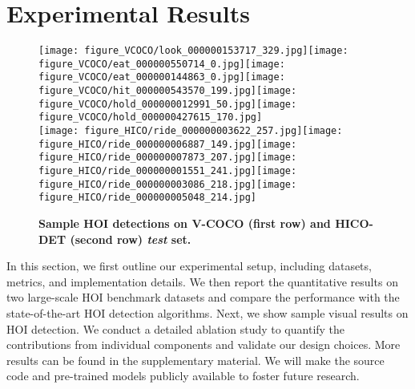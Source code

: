 \section{Experimental Results}
\label{sec:results}
\newlength\ftqa
\setlength\ftqa{2.0cm}
\newlength\ftqb
\setlength\ftqb{0.2mm}
\newlength\ftqc
\setlength\ftqc{0.8mm}

\begin{figure*}[t]

\texttt{[image: figure\_VCOCO/look\_000000153717\_329.jpg]}\hfill \texttt{[image: figure\_VCOCO/eat\_000000550714\_0.jpg]}\hfill \texttt{[image: figure\_VCOCO/eat\_000000144863\_0.jpg]}\hfill \texttt{[image: figure\_VCOCO/hit\_000000543570\_199.jpg]}\hfill \texttt{[image: figure\_VCOCO/hold\_000000012991\_50.jpg]}\hfill \texttt{[image: figure\_VCOCO/hold\_000000427615\_170.jpg]}\vspace{\ftqb}\\\texttt{[image: figure\_HICO/ride\_000000003622\_257.jpg]}\hfill \texttt{[image: figure\_HICO/ride\_000000006887\_149.jpg]}\hfill \texttt{[image: figure\_HICO/ride\_000000007873\_207.jpg]}\hfill \texttt{[image: figure\_HICO/ride\_000000001551\_241.jpg]}\hfill \texttt{[image: figure\_HICO/ride\_000000003086\_218.jpg]}\hfill \texttt{[image: figure\_HICO/ride\_000000005048\_214.jpg]}\caption{\textbf{Sample HOI detections on V-COCO (first row) and HICO-DET (second row) \emph{test} set.}
\label{fig:visual}
}
\end{figure*}
\vspace{-3.0mm}






 In this section, we first outline our experimental setup, including datasets, metrics, and implementation details. 
We then report the quantitative results on two large-scale HOI benchmark datasets and compare the performance with the state-of-the-art HOI detection algorithms.
Next, we show sample visual results on HOI detection. 
We conduct a detailed ablation study to quantify the contributions from individual components and validate our design choices.
More results can be found in the supplementary material.
We will make the source code and pre-trained models publicly available to foster future research.

